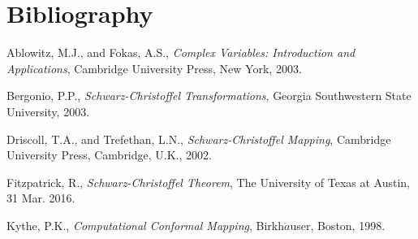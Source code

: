 \documentclass{article}
\begin{document}
\newpage
\section{Bibliography}
\begin{hangparas}{.25in}{1}
Ablowitz, M.J., and Fokas, A.S., \textit{Complex Variables: Introduction and Applications}, Cambridge University Press, New York, 2003.

Bergonio, P.P., \textit{Schwarz-Christoffel Transformations}, Georgia Southwestern State University, 2003.

Driscoll, T.A., and Trefethan, L.N., \textit{Schwarz-Christoffel Mapping}, Cambridge University Press, Cambridge, U.K., 2002.

Fitzpatrick, R., \textit{Schwarz-Christoffel Theorem}, The University of Texas at Austin, 31 Mar. 2016.

Kythe, P.K., \textit{Computational Conformal Mapping}, Birkh\(\ddot{a}\)user, Boston, 1998.
\end{hangparas}
\end{document}
